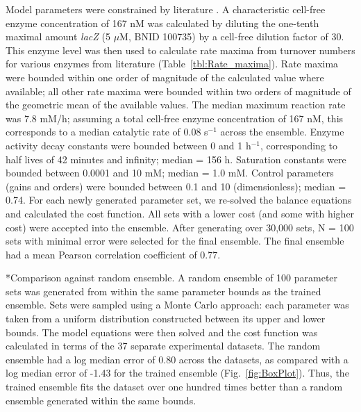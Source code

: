 \documentclass[12pt]{article}
\makeatletter
\renewcommand\subsection{\@startsection
	{subsection}{2}{0mm}
	{-0.05in}
	{-0.5\baselineskip}
	{\normalfont\normalsize\bfseries}}
\makeatother
\begin{document}
Model parameters were constrained by literature \cite{Milo:2009aa}.
A characteristic cell-free enzyme concentration of 167 nM was calculated by diluting the one-tenth maximal amount \textit{lacZ} (5 $\mu$M, BNID 100735) by  a cell-free dilution factor of 30.
This enzyme level was then used to calculate rate maxima from turnover numbers for various enzymes from literature (Table~\ref{tbl:Rate_maxima}).
Rate maxima were bounded within one order of magnitude of the calculated value where available; all other rate maxima were bounded within two orders of magnitude of the geometric mean of the available values.
The median maximum reaction rate was 7.8 mM/h; assuming a total cell-free enzyme concentration of 167 nM, this corresponds to a median catalytic rate of 0.08 s$^{-1}$ across the ensemble.
Enzyme activity decay constants were bounded between 0 and 1 h$^{-1}$, corresponding to half lives of 42 minutes and infinity; median = 156 h.
Saturation constants were bounded between 0.0001 and 10 mM; median = 1.0 mM.
Control parameters (gains and orders) were bounded between 0.1 and 10 (dimensionless); median = 0.74.
For each newly generated parameter set, we re-solved the balance equations and calculated the cost function.
All sets with a lower cost (and some with higher cost) were accepted into the ensemble.
After generating over 30,000 sets, N = 100 sets with minimal error were selected for the final ensemble.
The final ensemble had a mean Pearson correlation coefficient of 0.77.

\subsection*{Comparison against random ensemble.}
A random ensemble of 100 parameter sets was generated from within the same parameter bounds as the trained ensemble.
Sets were sampled using a Monte Carlo approach: each parameter was taken from a uniform distribution constructed between its upper and lower bounds.
The model equations were then solved and the cost function was calculated in terms of the 37 separate experimental datasets.
The random ensemble had a log median error of 0.80 across the datasets, as compared with a log median error of -1.43 for the trained ensemble (Fig.~\ref{fig:BoxPlot}).
Thus, the trained ensemble fits the dataset over one hundred times better than a random ensemble generated within the same bounds.
\end{document}
